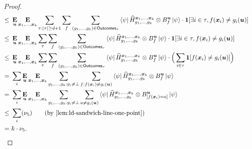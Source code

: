 \begin{proof}
\begin{align*}
 \leq~& \E_{\bu} \E_{\bx_1, \ldots, \bx_k}   \sum_{\tau:|\tau| \geq d+1} \sum_f \sum_{(g_1, \ldots, g_k) \in \mathsf{Outcomes}_{\tau}} \bra{\psi} \widehat{H}^{\bx_1, \ldots, \bx_k}_{g_1, \ldots, g_k} \otimes B^{\bu}_f \ket{\psi} \cdot \bone[\exists i \in \tau, f(\bx_i) \neq g_i(\bu)]\\
 \leq~& \E_{\bu} \E_{\bx_1, \ldots, \bx_k}   \sum_{\tau} \sum_f \sum_{(g_1, \ldots, g_k) \in \mathsf{Outcomes}_{\tau}} \bra{\psi} \widehat{H}^{\bx_1, \ldots, \bx_k}_{g_1, \ldots, g_k} \otimes B^{\bu}_f \ket{\psi} \cdot \bone[\exists i \in \tau, f(\bx_i) \neq g_i(\bu)]\\
 \leq~&  \E_{\bu} \E_{\bx_1, \ldots, \bx_k}  \sum_{\tau} \sum_f \sum_{(g_1, \ldots, g_k) \in \mathsf{Outcomes}_{\tau}} \bra{\psi} \widehat{H}^{\bx_1, \ldots, \bx_k}_{g_1, \ldots, g_k} \otimes B^{\bu}_f \ket{\psi} \cdot \Big(\sum_{i\in \tau} \bone[f(\bx_i) \neq g_i(\bu)]\Big)\\
 =~& \sum_i  \E_{\bu} \E_{\bx_1, \ldots, \bx_k}  \sum_{g_1, \ldots, g_k : g_i \neq \bot} \sum_{f: f(\bx_i) \neq g_i(\bu)} \bra{\psi} \widehat{H}^{\bx_1, \ldots, \bx_k}_{g_1, \ldots, g_k} \otimes B^{\bu}_f \ket{\psi}\\
 =~& \sum_i  \E_{\bu} \E_{\bx_1, \ldots, \bx_k}  \sum_{g_1, \ldots, g_k : g_i \neq \bot} \sum_{a \neq g_i(\bu)} \bra{\psi} \widehat{H}^{\bx_1, \ldots, \bx_k}_{g_1, \ldots, g_k} \otimes B^{\bu}_{[f(\bx_i)=a]} \ket{\psi}\\
 \leq~& \sum_i (\nu_5) \tag{by \Cref{lem:ld-sandwich-line-one-point}}\\
 =~& k \cdot \nu_5.
\end{align*}


\end{proof}
